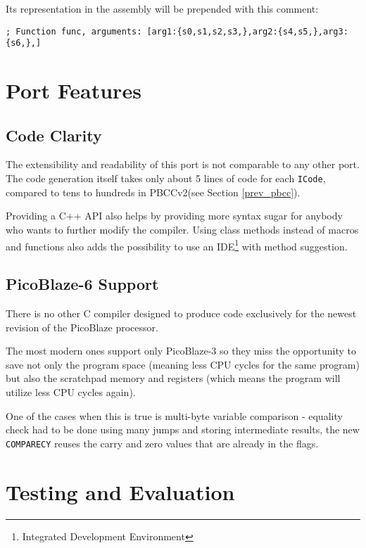             Its representation in the assembly will be prepended with this comment:

            \begin{center}\texttt{; Function func, arguments: [arg1:\{s0,s1,s2,s3,\},arg2:\{s4,s5,\},arg3:\{s6,\},]}\end{center}

\chapter{Port Features}\label{features}

    \section{Code Clarity}

    The extensibility and readability of this port is not comparable to any other port. The code generation itself takes only about 5 lines of code for each \texttt{ICode}, compared to tens to hundreds in PBCCv2(see Section \ref{prev_pbcc}).

    Providing a C++ API also helps by providing more syntax sugar for anybody who wants to further modify the compiler. Using class methods instead of macros and functions also adds the possibility to use an IDE\footnote{Integrated Development Environment} with method suggestion.

    \section{PicoBlaze-6 Support}

    There is no other C compiler designed to produce code exclusively for the newest revision of the PicoBlaze processor.

    The most modern ones support only PicoBlaze-3 so they miss the opportunity to save not only the program space (meaning less CPU cycles for the same program) but also the scratchpad memory and registers (which means the program will utilize less CPU cycles again).

    One of the cases when this is true is multi-byte variable comparison - equality check had to be done using many jumps and storing intermediate results, the new \texttt{COMPARECY} reuses the carry and zero values that are already in the flags.

\chapter{Testing and Evaluation}\label{evaluation}

